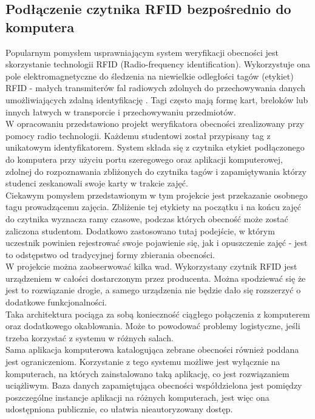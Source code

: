 \documentclass[declaration,shortabstract, mgr]{iithesis}
\begin{document}
\subsection{Podłączenie czytnika RFID bezpośrednio do komputera}
\indent Popularnym pomysłem usprawniającym system weryfikacji obecności jest skorzystanie technologii RFID (Radio-frequency identification). Wykorzystuje ona pole elektromagnetyczne do śledzenia na niewielkie odległości tagów (etykiet) RFID - małych transmiterów fal radiowych zdolnych do przechowywania danych umożliwiających zdalną identyfikację \cite{rfid_itself}. Tagi często mają formę kart, breloków lub innych łatwych w transporcie i przechowywaniu przedmiotów.\\
\indent W opracowaniu \cite{rfid_serial} przedstawiono projekt weryfikatora obecności zrealizowany przy pomocy radio technologii. Każdemu studentowi został przypisany tag z unikatowym identyfikatorem. System składa się z czytnika etykiet podłączonego do komputera przy użyciu portu szeregowego oraz aplikacji komputerowej, zdolnej do rozpoznawania zbliżonych do czytnika tagów i zapamiętywania którzy studenci zeskanowali swoje karty w trakcie zajęć. \\
\indent Ciekawym pomysłem przedstawionym w tym projekcie jest przekazanie osobnego tagu prowadzącemu zajęcia. Zbliżenie tej etykiety na początku i na końcu zajęć do czytnika wyznacza ramy czasowe, podczas których obecność może zostać zaliczona studentom. Dodatkowo zastosowano tutaj podejście, w którym uczestnik powinien rejestrować swoje pojawienie się, jak i opuszczenie zajęć - jest to odstępstwo od tradycyjnej formy zbierania obecności. \\
\indent W projekcie można zaobserwować kilka wad. Wykorzystany czytnik RFID jest urządzeniem w całości dostarczonym przez producenta. Można spodziewać się że jest to rozwiązanie drogie, a samego urządzenia nie będzie dało się rozszerzyć o dodatkowe funkcjonalności. \\
\indent Taka architektura pociąga za sobą konieczność ciągłego połączenia z komputerem oraz dodatkowego okablowania. Może to powodować problemy logistyczne, jeśli trzeba korzystać z systemu w różnych salach.\\
\indent Sama aplikacja komputerowa katalogująca zebrane obecności również poddana jest ograniczeniom. Korzystanie z tego systemu możliwe jest wyłącznie na komputerach, na których zainstalowano taką aplikację, co jest rozwiązaniem uciążliwym. Baza danych zapamiętująca obecności współdzielona jest pomiędzy poszczególne instancje aplikacji na różnych komputerach, jest więc ona udostępniona publicznie, co ułatwia nieautoryzowany dostęp.
\end{document}
